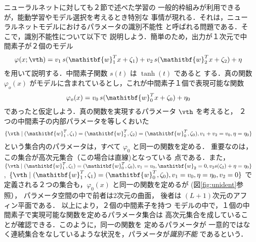 \documentclass[master]{cimt}
\newcommand{\vw}{\mathitbf{w}}
\begin{document}


ニューラルネットに対しても２節で述べた学習の
一般的枠組みが利用できるが，能動学習やモデル選択を考えるとき特別な
事情が現れる．それは，ニューラルネットモデルにおけるパラメータの識別不能性
と呼ばれる問題である．そこで，識別不能性について以下で
説明しよう．簡単のため，出力が１次元で中間素子が２個のモデル
\begin{equation*}
	\varphi(x;\vth) = v_1\, s(\vw_1^T x + \zeta_1) + 
		v_2\, s(\vw_2^T x + \zeta_2) + \eta
\end{equation*}
を用いて説明する．中間素子関数 $s(t)$ は $\tanh(t)$ であると
する．真の関数 $\varphi_o(x)$ 
がモデルに含まれているとし，これが中間素子１個で表現可能な関数
\begin{equation*}
	\varphi_o(x) = v_0\, s(\vw_0^T x + \zeta_0) + \eta_0
\end{equation*}
であったと仮定しよう．真の関数を実現するパラメータ $\vth$ を考えると，
２つの中間素子の内部パラメータを等しくおいた
\[
	\{ \vth \mid (\vw_1^T,\zeta_1) = (\vw_2^T,\zeta_2) = 
		(\vw_0^T,\zeta_0),   v_1+v_2 = v_0, \eta = \eta_0 \}
\]
という集合内のパラメータは，すべて $\varphi_0$ と同一の関数を定める．
重要なのは，この集合が高次元集合（この場合は直線)となっている
点である．また，
$
	\{ \vth \mid (\vw_1^T,\zeta_1) = (\vw_0^T,\zeta_0), v_1 = v_0, 
	\vw_2 = 0, v_2 s(\zeta_2) + \eta = \eta_0 \}
$, 
$
	\{ \vth \mid (\vw_1^T,\zeta_1) = (\vw_0^T,\zeta_0), v_1 = v_0, 
	\eta = \eta_0, v_2 = 0\}
$
で定義される２つの集合も，$\varphi_0(x)$ と同一の関数を定めるが
(図\ref{fig:unident}参照），
パラメータ空間の中で前者は$2$次元の曲面，
後者は $(L+1)$次元のアフィン平面である．
以上により，２個の中間素子を持つ
モデルの中で，１個の中間素子で実現可能な関数を定めるパラメータ集合は
高次元集合を成していることが確認できる．このように，同一の関数を
定めるパラメータが
一意的ではなく連続集合をなしているような状況を，パラメータが{\em 識別不能}
であるという．


\end{document}

